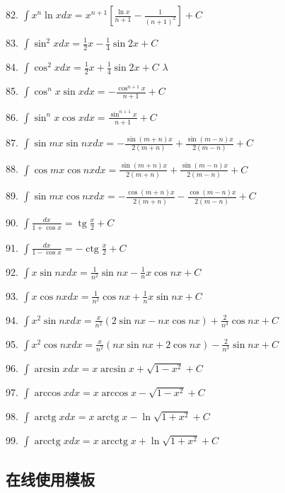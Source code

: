 \documentclass[lang=cn,newtx,10pt,scheme=chinese]{elegantbook}
\begin{document}
82. \(\int {x}^{n}\ln {xdx} = {x}^{n + 1}\left\lbrack {\frac{\ln x}{n + 1} - \frac{1}{{\left( n + 1\right) }^{2}}}\right\rbrack + C\)

83. \(\int {\sin }^{2}{xdx} = \frac{1}{2}x - \frac{1}{4}\sin {2x} + C\)

84. \(\int {\cos }^{2}{xdx} = \frac{1}{2}x + \frac{1}{4}\sin {2x} + C\) \(\lambda\)

85. \(\int {\cos }^{n}x\sin {xdx} = - \frac{{\cos }^{n + 1}x}{n + 1} + C\)

86. \(\int {\sin }^{n}x\cos {xdx} = \frac{{\sin }^{n + 1}x}{n + 1} + C\)

87. \(\int \sin {mx}\sin {nxdx} = - \frac{\sin \left( {m + n}\right) x}{2\left( {m + n}\right) } + \frac{\sin \left( {m - n}\right) x}{2\left( {m - n}\right) } + C\)

88. \(\int \cos {mx}\cos {nxdx} = \frac{\sin \left( {m + n}\right) x}{2\left( {m + n}\right) } + \frac{\sin \left( {m - n}\right) x}{2\left( {m - n}\right) } + C\)

89. \(\int \sin {mx}\cos {nxdx} = - \frac{\cos \left( {m + n}\right) x}{2\left( {m + n}\right) } - \frac{\cos \left( {m - n}\right) x}{2\left( {m - n}\right) } + C\)

90. \(\int \frac{dx}{1 + \cos x} = \operatorname{tg}\frac{x}{2} + C\)

91. \(\int \frac{dx}{1 - \cos x} = - \operatorname{ctg}\frac{x}{2} + C\)

92. \(\int x\sin {nxdx} = \frac{1}{{n}^{2}}\sin {nx} - \frac{1}{n}x\cos {nx} + C\)

93. \(\int x\cos {nxdx} = \frac{1}{{n}^{2}}\cos {nx} + \frac{1}{n}x\sin {nx} + C\)

94. \(\int {x}^{2}\sin {nxdx} = \frac{x}{{n}^{2}}\left( {2\sin {nx} - {nx}\cos {nx}}\right) + \frac{2}{{n}^{3}}\cos {nx} + C\)

95. \(\int {x}^{2}\cos {nxdx} = \frac{x}{{n}^{2}}\left( {{nx}\sin {nx} + 2\cos {nx}}\right) - \frac{2}{{n}^{3}}\sin {nx} + C\)

96. \(\int \arcsin {xdx} = x\arcsin x + \sqrt{1 - {x}^{2}} + C\)

97. \(\int \arccos {xdx} = x\arccos x - \sqrt{1 - {x}^{2}} + C\)

98. \(\int \operatorname{arctg}{xdx} = x\operatorname{arctg}x - \ln \sqrt{1 + {x}^{2}} + C\)

99. \(\int \operatorname{arcctg}{xdx} = x\operatorname{arcctg}x + \ln \sqrt{1 + {x}^{2}} + C\)

\subsection{在线使用模板}
\end{document}
